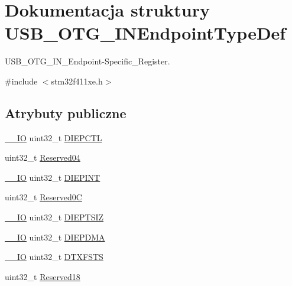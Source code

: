 \hypertarget{struct_u_s_b___o_t_g___i_n_endpoint_type_def}{}\section{Dokumentacja struktury U\+S\+B\+\_\+\+O\+T\+G\+\_\+\+I\+N\+Endpoint\+Type\+Def}
\label{struct_u_s_b___o_t_g___i_n_endpoint_type_def}


U\+S\+B\+\_\+\+O\+T\+G\+\_\+\+I\+N\+\_\+\+Endpoint-\/\+Specific\+\_\+\+Register.  




{\ttfamily \#include $<$stm32f411xe.\+h$>$}

\subsection*{Atrybuty publiczne}
\begin{DoxyCompactItemize}
\item 
\hyperlink{core__sc300_8h_aec43007d9998a0a0e01faede4133d6be}{\+\_\+\+\_\+\+IO} uint32\+\_\+t \hyperlink{struct_u_s_b___o_t_g___i_n_endpoint_type_def_a7ae9a62fb2acdc8981930ceb8ba5f100}{D\+I\+E\+P\+C\+TL}
\item 
uint32\+\_\+t \hyperlink{struct_u_s_b___o_t_g___i_n_endpoint_type_def_ab40b947e437eea142bb6682282b073d6}{Reserved04}
\item 
\hyperlink{core__sc300_8h_aec43007d9998a0a0e01faede4133d6be}{\+\_\+\+\_\+\+IO} uint32\+\_\+t \hyperlink{struct_u_s_b___o_t_g___i_n_endpoint_type_def_af66b4da67fb3732d6fd4f98dd0e9f824}{D\+I\+E\+P\+I\+NT}
\item 
uint32\+\_\+t \hyperlink{struct_u_s_b___o_t_g___i_n_endpoint_type_def_a30c3ab77aa3174965375dfe1a01bdddb}{Reserved0C}
\item 
\hyperlink{core__sc300_8h_aec43007d9998a0a0e01faede4133d6be}{\+\_\+\+\_\+\+IO} uint32\+\_\+t \hyperlink{struct_u_s_b___o_t_g___i_n_endpoint_type_def_aeda9700dcd52e252d7809cabed971bab}{D\+I\+E\+P\+T\+S\+IZ}
\item 
\hyperlink{core__sc300_8h_aec43007d9998a0a0e01faede4133d6be}{\+\_\+\+\_\+\+IO} uint32\+\_\+t \hyperlink{struct_u_s_b___o_t_g___i_n_endpoint_type_def_a8a7731263a0403b02e369ca387dce8e0}{D\+I\+E\+P\+D\+MA}
\item 
\hyperlink{core__sc300_8h_aec43007d9998a0a0e01faede4133d6be}{\+\_\+\+\_\+\+IO} uint32\+\_\+t \hyperlink{struct_u_s_b___o_t_g___i_n_endpoint_type_def_a2343fef0358d8713918d26eb93f1fa8b}{D\+T\+X\+F\+S\+TS}
\item 
uint32\+\_\+t \hyperlink{struct_u_s_b___o_t_g___i_n_endpoint_type_def_a525d6997cba563967fd7ea22898ed4f6}{Reserved18}
\end{DoxyCompactItemize}


